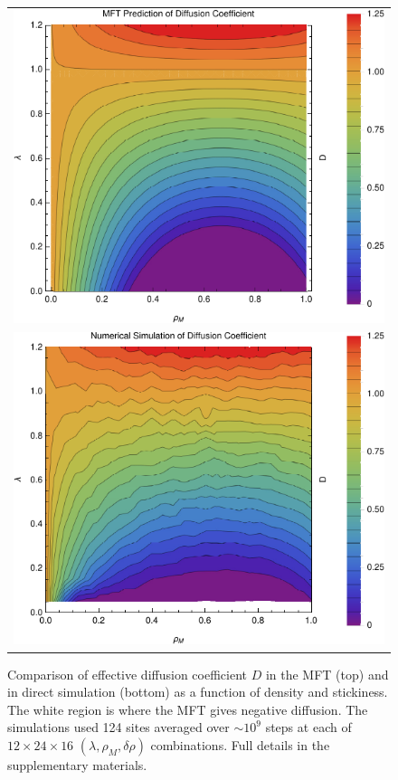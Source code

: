 \documentclass[
reprint, amsmath,amssymb,
]{revtex4-1}
\begin{document}
\begin{figure}[h!]
\vspace{1em}
\begin{center}
 \begin{tabular}{c}
    \includegraphics[width=1\linewidth]{newAnalFlow} \\
    \includegraphics[width=1\linewidth]{newDataFlow}
    \end{tabular}
\end{center}
\caption{\label{fig:diffCoef}
Comparison of effective diffusion coefficient $D$ in the MFT (top) and in direct simulation (bottom) as a function of density and stickiness.
The white region is where the MFT gives negative diffusion. The simulations used 124 sites averaged over $\sim 10^9$ steps at each of $12 \times 24 \times 16 $ $(\lambda, \rho_M, \delta \rho)$ combinations.  
Full details in the supplementary materials.}
    \vspace{-2em}
\end{figure}
\end{document}

